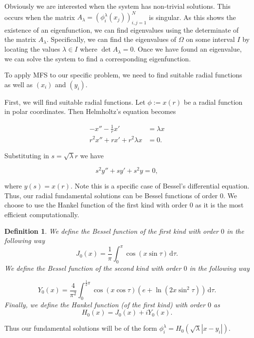 \documentclass[12pt]{report}
\newtheorem{definition}{Definition}
\numberwithin{definition}{section}
\begin{document}
Obviously we are interested when the system has non-trivial solutions.
This occurs when the matrix $A_{\lambda} = (\phi_{i}^{\lambda}(x_{j}))_{i,j = 1}^N$ is singular.
As this shows the existence of an eigenfunction, we can find eigenvalues using the determinate of the matrix $A_{\lambda}$.
Specifically, we can find the eigenvalues of $\Omega$ on some interval $I$ by locating the values $\lambda \in I$ where $\det A_{\lambda} = 0$.
Once we have found an eigenvalue, we can solve the system to find a corresponding eigenfunction.


To apply MFS to our specific problem, we need to find suitable radial functions as well as $(x_{i})$ and $(y_{i})$.

First, we will find suitable radial functions.
Let $\phi := x(r)$ be a radial function in polar coordinates.
Then Helmholtz's equation becomes

  \begin{align*}
    -x'' - \frac{1}{r} x' &= \lambda x \\
    r^2 x'' + r x' + r^2 \lambda x &= 0.
  \end{align*}

Substituting in $s = \sqrt{\lambda} r$ we have

\[
  s^2 y'' + s y' + s^2 y = 0
,\] 

where $y(s) = x(r)$.
Note this is a specific case of Bessel's differential equation.
Thus, our radial fundamental solutions can be Bessel functions of order $0$.
We choose to use the Hankel function of the first kind with order $0$ as it is the most efficient computationally.

\begin{definition}
  We define the Bessel function of the first kind with order $0$ in the following way
  \[
    J_{0}(x) = \frac{1}{\pi} \int_{ 0}^{\pi} \! \cos(x \sin \tau) \, \mathrm{d}\tau 
  .\] 
  We define the Bessel function of the second kind with order $0$ in the following way

  \[
    Y_{0}(x) = \frac{4}{\pi^2} \int_{0}^{\frac{1}{2}\pi} \! \cos(x \cos \tau) \left( e + \ln \left( 2x \sin^2 \tau \right) \right) \, \mathrm{d}\tau 
  .\] 
  Finally, we define the Hankel function (of the first kind) with order $0$ as
  \[
  H_{0}(x) = J_{0}(x) + i Y_{0}(x)
  .\] 
\end{definition}

Thus our fundamental solutions will be of the form $\phi_{i}^\lambda = H_{0} ( \sqrt{\lambda} |x - y_{i} | ) $.
\end{document}
